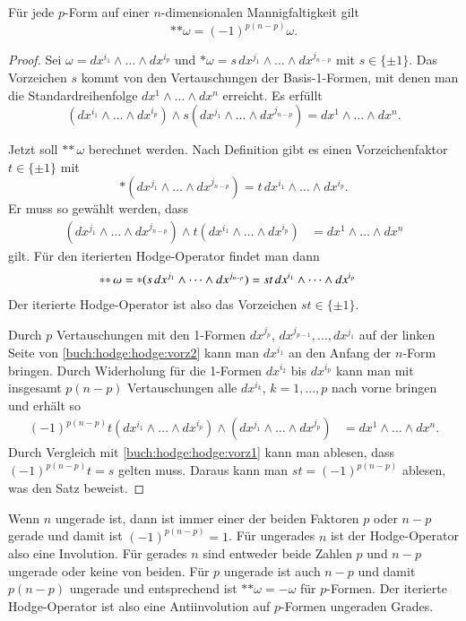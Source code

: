 \begin{satz}
Für jede $p$-Form auf einer $n$-dimensionalen Mannigfaltigkeit gilt
\[
\ast{\ast \omega}
=
(-1)^{p(n-p)}\omega.
\]
\end{satz}

\begin{proof}
Sei $\omega = dx^{i_1}\wedge\dots\wedge dx^{i_p}$ und 
$\ast\omega = s\,dx^{j_1}\wedge\dots\wedge dx^{j_{n-p}}$ mit
$s\in\{\pm 1\}$.
Das Vorzeichen $s$ kommt von den Vertauschungen der Basis-1-Formen,
mit denen man die Standardreihenfolge $dx^1\wedge \dots\wedge dx^n$
erreicht.
Es erfüllt
\begin{equation}
(dx^{i_1}\wedge\dots\wedge dx^{i_p})
\wedge
s(dx^{j_1}\wedge\dots\wedge dx^{j_{n-p}})
=
dx^1\wedge\dots\wedge dx^n.
\label{buch:hodge:hodge:vorz1}
\end{equation}

Jetzt soll $\ast{\ast\,\omega}$ berechnet werden.
Nach Definition gibt es einen Vorzeichenfaktor $t\in\{\pm1\}$ mit
\[
\ast(dx^{j_1}\wedge\dots\wedge dx^{j_{n-p}})
=
t\,dx^{i_1}\wedge\dots\wedge dx^{i_p}.
\]
Er muss so gewählt werden, dass
\begin{align}
(dx^{j_1}\wedge\dots\wedge dx^{j_{n-p}})
\wedge
t(dx^{i_1}\wedge\dots\wedge dx^{i_p})
&=
dx^1\wedge\dots\wedge dx^n
\label{buch:hodge:hodge:vorz2}
\end{align}
gilt.
Für den iterierten Hodge-Operator findet man dann
\begin{align}
\ast{\ast\, \omega}
=
\ast(s\,dx^{j_1}\wedge\dots\wedge dx^{j_{n-p}})
&=
st\, dx^{i_1}\wedge\dots\wedge dx^{i_p}
\notag
\end{align}
Der iterierte Hodge-Operator ist also das Vorzeichen $st\in\{\pm 1\}$.

Durch $p$ Vertauschungen mit den 1-Formen $dx^{j_p}$,
$dx^{j_{p-1}},\dots,dx^{j_1}$ auf der linken Seite von
\eqref{buch:hodge:hodge:vorz2}
kann man $dx^{i_1}$ an den Anfang
der $n$-Form bringen.
Durch Widerholung für die 1-Formen $dx^{i_2}$ bis $dx^{i_p}$ kann
man mit insgesamt $p(n-p)$ Vertauschungen alle $dx^{i_k}$, $k=1,\dots,p$
nach vorne bringen und erhält so
\begin{align}
(-1)^{p(n-p)}
t(dx^{i_1}\wedge\dots\wedge dx^{i_p})
\wedge
(dx^{j_1}\wedge\dots\wedge dx^{j_p})
&=
dx^1\wedge\dots\wedge dx^n.
\end{align}
Durch Vergleich mit 
\eqref{buch:hodge:hodge:vorz1}
kann man ablesen, dass $(-1)^{p(n-p)}t=s$ gelten muss.
Daraus kann man
$st=(-1)^{p(n-p)}$ ablesen, was den Satz beweist.
\end{proof}

Wenn $n$ ungerade ist, dann ist immer einer der beiden Faktoren $p$
oder $n-p$ gerade und damit ist $(-1)^{p(n-p)}=1$.
Für ungerades $n$ ist der Hodge-Operator also eine Involution.
%
Für gerades $n$ sind entweder beide Zahlen $p$ und $n-p$ ungerade
oder keine von beiden.
Für $p$ ungerade ist auch $n-p$ und damit $p(n-p)$ ungerade
und entsprechend ist $\ast{\ast\omega}=-\omega$ für $p$-Formen.
Der iterierte Hodge-Operator ist also eine Antiinvolution auf
$p$-Formen ungeraden Grades.


